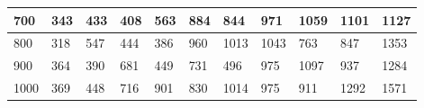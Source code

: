 \documentclass[10pt,letterpaper]{article}
\begin{document}
\begin{center}
\begin{table}
\begin{tabular} { |m{0.5cm}|m{1.3cm}|m{1.3cm}|m{1.3cm}|m{1.3cm}|m{1.3cm}|m{1.3cm}|m{1.3cm}|m{1.3cm}|m{1.3cm}|m{1.3cm}|}
\hline
\cellcolor{Gray}700 & \Large 343 & \Large 433 & \Large 408 & \Large 563 & \Large 884 & \Large 844 & \Large 971 & \Large 1059 & \Large 1101 & \Large 1127 \\
\hline
\cellcolor{Gray}800 & \Large 318 & \Large 547 & \Large 444 & \Large 386 & \Large 960 & \Large 1013 & \Large 1043 & \Large 763 & \Large 847 & \Large 1353 \\
\hline
\cellcolor{Gray}900 & \Large 364 & \Large 390 & \Large 681 & \Large 449 & \Large 731 & \Large 496 & \Large 975 & \Large 1097 & \Large 937 & \Large 1284 \\
\hline
\cellcolor{Gray}1000 & \Large 369 & \Large 448 & \Large 716 & \Large 901 & \Large 830 & \Large 1014 & \Large 975 & \Large 911 & \Large 1292 & \Large 1571 \\
\hline
\end{tabular} \\
\end{table}
\end{center}
\newpage 
{}
\end{document}
